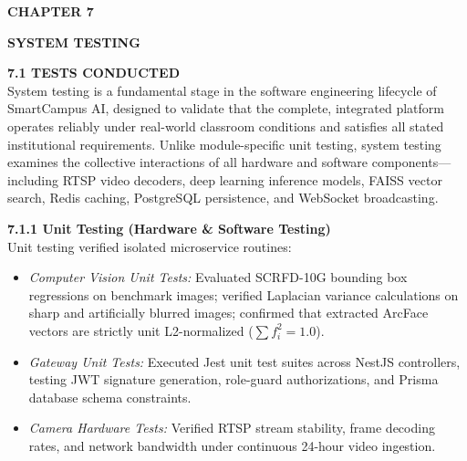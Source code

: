 \newpage
\begin{flushleft}
{\fontsize{16pt}{16pt}\selectfont \textbf{CHAPTER 7}}
\end{flushleft}		
\begin{center}
{\fontsize{18pt}{22pt}\selectfont \textbf{SYSTEM TESTING}}\\[2mm]
\end{center}

\onehalfspacing
\justifying
\noindent \textbf{7.1 TESTS CONDUCTED} \\[2mm]
System testing is a fundamental stage in the software engineering lifecycle of SmartCampus AI, designed to validate that the complete, integrated platform operates reliably under real-world classroom conditions and satisfies all stated institutional requirements. Unlike module-specific unit testing, system testing examines the collective interactions of all hardware and software components—including RTSP video decoders, deep learning inference models, FAISS vector search, Redis caching, PostgreSQL persistence, and WebSocket broadcasting.

\vspace{0.15in}
\noindent \textbf{7.1.1 Unit Testing (Hardware \& Software Testing)} \\
Unit testing verified isolated microservice routines:
\begin{itemize}
    \item \textit{Computer Vision Unit Tests:} Evaluated SCRFD-10G bounding box regressions on benchmark images; verified Laplacian variance calculations on sharp and artificially blurred images; confirmed that extracted ArcFace vectors are strictly unit L2-normalized ($\sum f_i^2 = 1.0$).
    \item \textit{Gateway Unit Tests:} Executed Jest unit test suites across NestJS controllers, testing JWT signature generation, role-guard authorizations, and Prisma database schema constraints.
    \item \textit{Camera Hardware Tests:} Verified RTSP stream stability, frame decoding rates, and network bandwidth under continuous 24-hour video ingestion.
\end{itemize}

